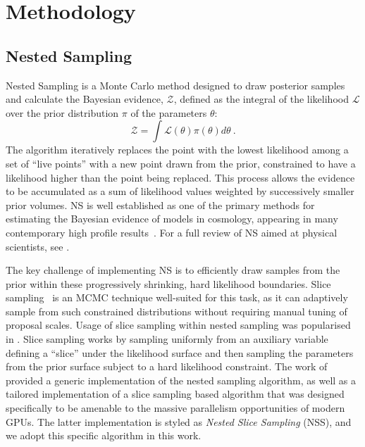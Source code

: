 \documentclass[twocolumn]{openjournal}
\begin{document}
\section{Methodology}
\label{sec:methodology}
\subsection{Nested Sampling}
Nested Sampling \citep[NS;][]{Skilling06} is a Monte Carlo method designed to draw posterior samples and calculate the Bayesian evidence, $\mathcal{Z}$, defined as the integral of the likelihood $\mathcal{L}$ over the prior distribution $\pi$ of the parameters $\theta$:
\begin{equation}
    \mathcal{Z}=\int \mathcal{L}(\theta) \pi(\theta) d\theta \ . \label{eq:evidence}
\end{equation}
The algorithm iteratively replaces the point with the lowest likelihood among a set of ``live points'' with a new point drawn from the prior, constrained to have a likelihood higher than the point being replaced. This process allows the evidence to be accumulated as a sum of likelihood values weighted by successively smaller prior volumes. NS is well established as one of the primary methods for estimating the Bayesian evidence of models in cosmology, appearing in many contemporary high profile results~\citep[e.g.][]{planck,Abbott_2022, kidslegacy}. For a full review of NS aimed at physical scientists, see \citealt{Ashton_2022}.

The key challenge of implementing NS is to efficiently draw samples from the prior within these progressively shrinking, hard likelihood boundaries. Slice sampling~\citep{neal_slice_2003} is an MCMC technique well-suited for this task, as it can adaptively sample from such constrained distributions without requiring manual tuning of proposal scales. Usage of slice sampling within nested sampling was popularised in \cite{polychord,Polychord2}. Slice sampling works by sampling uniformly from an auxiliary variable defining a ``slice'' under the likelihood surface and then sampling the parameters from the prior surface subject to a hard likelihood constraint. The work of \cite{NSSyallup} provided a generic implementation of the nested sampling algorithm, as well as a tailored implementation of a slice sampling based algorithm that was designed specifically to be amenable to the massive parallelism opportunities of modern GPUs. The latter implementation is styled as \emph{Nested Slice Sampling} (NSS), and we adopt this specific algorithm in this work.
\end{document}
